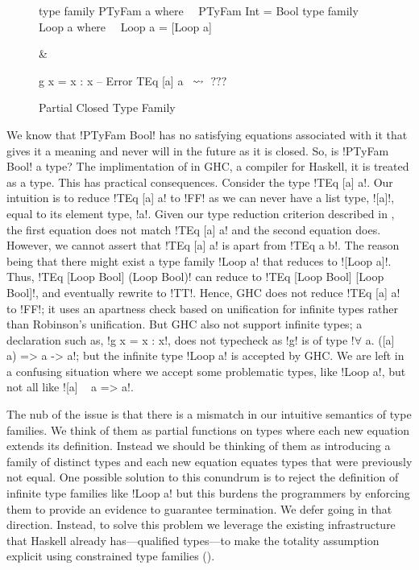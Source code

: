 \documentclass[format=acmsmall,manuscript,review,screen,nonacm,margin=1in,11pt]{acmart}
\begin{document}
\begin{figure}[ht]
    \footnotesize
  \begin{tabularx}\textwidth{X X}
\begin{code}^^J
type family PTyFam a where^^J
\ \  PTyFam Int = Bool^^J
^^J
type family Loop a where^^J
\ \  Loop a = [Loop a]^^J
\end{code}&%
\begin{code}^^J
g x = x : x -- Error^^J
^^J
TEq [a] a \ $\mathrel{\rightsquigarrow}$\ $???$^^J
\end{code}
  \end{tabularx}
  \caption{Partial Closed Type Family}
  \label{fig:partial-tyfam}
\end{figure}
We know that !PTyFam Bool! has no satisfying equations associated with it
that gives it a meaning and never will in the future
as it is closed. So, is !PTyFam Bool! a type? 
The implimentation of \CLTF in GHC\cite{ghc_2020}, a compiler for Haskell,
it is treated as a type. This has practical consequences. Consider the type !TEq [a] a!.
Our intuition is to reduce !TEq [a] a! to !FF! as we can never have a list type, ![a]!,
equal to its element type, !a!.
Given our type reduction criterion described in ,
the first equation does not match !TEq [a] a! and the second equation does.
However, we cannot assert that !TEq [a] a! is apart from !TEq a b!. 
The reason being that there might exist a type family !Loop a! that reduces to ![Loop a]!.
Thus, !TEq [Loop Bool] (Loop Bool)! can reduce to !TEq [Loop Bool] [Loop Bool]!, and eventually rewrite to !TT!.
Hence, GHC does not reduce !TEq [a] a! to !FF!; it uses an apartness check based on unification for
infinite types rather than Robinson's unification.
But GHC also not support infinite types; a declaration such as,
!g x = x : x!, does not typecheck as !g! is of type !$\forall$ a. ([a] ~ a) => a -> a!;
but the infinite type !Loop a! is accepted by GHC. We are left in a confusing situation
where we accept some problematic types, like !Loop a!, but not all like ![a] ~ a => a!.

The nub of the issue is that there is a mismatch in our intuitive semantics of type families.
We think of them as partial functions on types where each new equation extends its definition.
Instead we should be thinking of them as introducing a family of distinct types and
each new equation equates types that were previously not equal.
One possible solution to this conundrum is to reject the definition of infinite type families
like !Loop a! but this burdens the programmers by enforcing them to provide an evidence
to guarantee termination. We defer going in that direction.
Instead, to solve this problem we leverage the existing infrastructure that Haskell already has---qualified
types---to make the totality assumption explicit using constrained type families (\QLTF).
\end{document}
